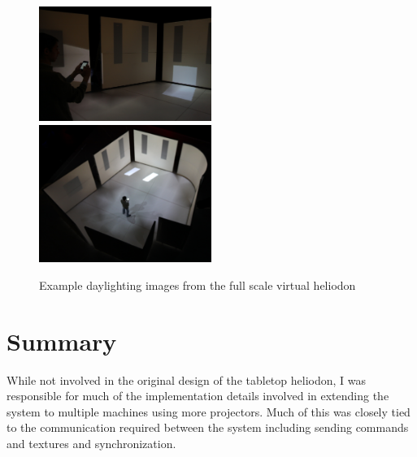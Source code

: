 \begin{figure}[t]
\includegraphics[width=0.5\textwidth]{images/IMG_2092_crop.jpg}
\includegraphics[width=0.5\textwidth]{images/IMG_2119_crop.jpg}

\caption{Example daylighting images from the full scale virtual heliodon}

\end{figure}
\section{Summary}
While not involved in the original design of the tabletop heliodon, I was responsible for much of the implementation details involved in extending the system to multiple machines using more projectors.  Much of this was closely tied to the communication required between the system including sending commands and textures and synchronization.

